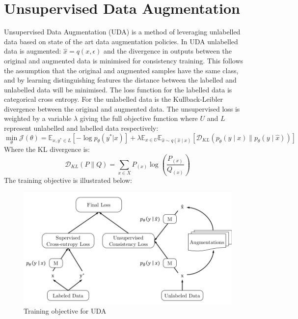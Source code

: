 \documentclass[a4paper]{article}
\begin{document}
\section{Unsupervised Data Augmentation}
Unsupervised Data Augmentation (UDA) is a method of leveraging unlabelled data based on state of the art data augmentation policies. In UDA unlabelled data is augmented: $\hat{x}=q(x,\epsilon)$ and the divergence in outputs between the original and augmented data is minimised for consistency training. This follows the assumption that the original and augmented samples have the same class, and by learning distinguishing features the distance between the labelled and unlabelled data will be minimised. The loss function for the labelled data is categorical cross entropy. For the unlabelled data is the Kullback-Leibler divergence between the original and augmented data. The unsupervised loss is weighted by a variable $\lambda$ giving the full objective function where $U$ and $L$ represent unlabelled and labelled data respectively:
\begin{equation}
\min_{\theta} \mathcal{J}(\theta) =\mathbb{E}_{x,y^* \in L}[-\log p_\theta (y^* | x)]+\lambda\mathbb{E}_{x \in U}\mathbb{E}_{\hat{x}\sim q(\hat{x} \mid x)}[\mathcal{D}_{KL}(p_{\tilde{\theta}}(y \mid x) \parallel p_\theta (y \mid \hat{x})) ]
\end{equation}
Where the KL divergence is:
\begin{equation}
\mathcal{D}_{KL}(P \parallel Q) = \sum_{x \in X} P_{(x)} \log \left(\frac{P_{(x)}}{Q_{(x)}}\right)
\end{equation}
The training objective is illustrated below:
\begin{figure}[h]
  \begin{center}
    \includegraphics[width=.8\textwidth]{training_objective}
    \caption{Training objective for UDA}
  \end{center}
\end{figure}
\end{document}
